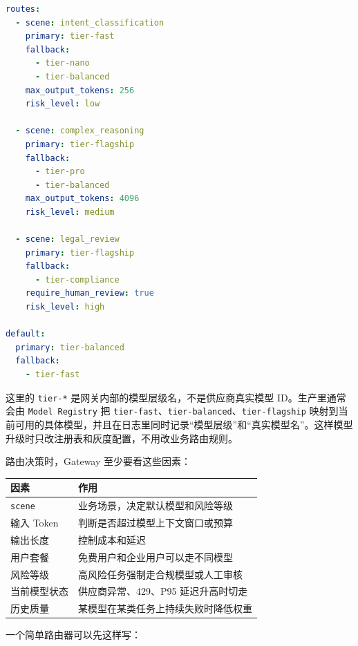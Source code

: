 \documentclass[9pt,a4paper,twocolumn]{ctexart}
\begin{document}
\begin{lstlisting}[language=yaml]
routes:
  - scene: intent_classification
    primary: tier-fast
    fallback:
      - tier-nano
      - tier-balanced
    max_output_tokens: 256
    risk_level: low

  - scene: complex_reasoning
    primary: tier-flagship
    fallback:
      - tier-pro
      - tier-balanced
    max_output_tokens: 4096
    risk_level: medium

  - scene: legal_review
    primary: tier-flagship
    fallback:
      - tier-compliance
    require_human_review: true
    risk_level: high

default:
  primary: tier-balanced
  fallback:
    - tier-fast
\end{lstlisting}



这里的 \texttt{tier-*} 是网关内部的模型层级名，不是供应商真实模型 ID。生产里通常会由 \texttt{Model Registry} 把 \texttt{tier-fast}、\texttt{tier-balanced}、\texttt{tier-flagship} 映射到当前可用的具体模型，并且在日志里同时记录“模型层级”和“真实模型名”。这样模型升级时只改注册表和灰度配置，不用改业务路由规则。



路由决策时，Gateway 至少要看这些因素：


{\footnotesize
\begin{tabular}{|p{}|p{}|}
\hline
\textbf{因素} & \textbf{作用} \\
\hline
\texttt{scene} & 业务场景，决定默认模型和风险等级 \\
\hline
输入 Token & 判断是否超过模型上下文窗口或预算 \\
\hline
输出长度 & 控制成本和延迟 \\
\hline
用户套餐 & 免费用户和企业用户可以走不同模型 \\
\hline
风险等级 & 高风险任务强制走合规模型或人工审核 \\
\hline
当前模型状态 & 供应商异常、429、P95 延迟升高时切走 \\
\hline
历史质量 & 某模型在某类任务上持续失败时降低权重 \\
\hline
\end{tabular}
}



一个简单路由器可以先这样写：
\end{document}
